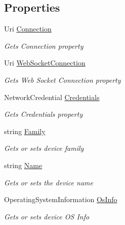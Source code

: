 \subsection*{Properties}
\begin{DoxyCompactItemize}
\item 
Uri \hyperlink{class_xbox_wdp_driver_1_1_device_portal_connection_ac681c14789da6f5395c4d3e1635ca0d6}{Connection}
\begin{DoxyCompactList}\small\item\em Gets Connection property \end{DoxyCompactList}\item 
Uri \hyperlink{class_xbox_wdp_driver_1_1_device_portal_connection_a874bd3882101be42e70e947a9cfe409c}{Web\+Socket\+Connection}
\begin{DoxyCompactList}\small\item\em Gets Web Socket Connection property \end{DoxyCompactList}\item 
Network\+Credential \hyperlink{class_xbox_wdp_driver_1_1_device_portal_connection_aa3b592f4dc8e65a15b520c7c5f62620e}{Credentials}
\begin{DoxyCompactList}\small\item\em Gets Credentials property \end{DoxyCompactList}\item 
string \hyperlink{class_xbox_wdp_driver_1_1_device_portal_connection_aca1657b3c394128835c245f29f17aba1}{Family}
\begin{DoxyCompactList}\small\item\em Gets or sets device family \end{DoxyCompactList}\item 
string \hyperlink{class_xbox_wdp_driver_1_1_device_portal_connection_a4f8d7e0494e217af4859600b73f35d14}{Name}
\begin{DoxyCompactList}\small\item\em Gets or sets the device name \end{DoxyCompactList}\item 
Operating\+System\+Information \hyperlink{class_xbox_wdp_driver_1_1_device_portal_connection_a9cdea6691c878986b05c56149e6396de}{Os\+Info}
\begin{DoxyCompactList}\small\item\em Gets or sets device OS Info \end{DoxyCompactList}\end{DoxyCompactItemize}


